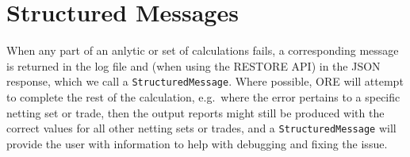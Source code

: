 

\section{Structured Messages}\label{sec:structured_messages}


When any part of an anlytic or set of calculations fails, a corresponding message is returned in the log file and (when using the
RESTORE API) in the JSON response, which we call a \lstinline!StructuredMessage!. Where possible, ORE will attempt to complete the
rest of the calculation, e.g.\ where the error pertains to a specific netting set or trade, then the output reports might still be
produced with the correct values for all other netting sets or trades, and a \lstinline!StructuredMessage! will provide the user with
information to help with debugging and fixing the issue.

